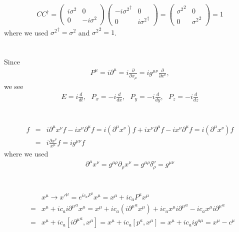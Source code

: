 \documentclass[11pt]{article}
\def\del{{\partial}}
\begin{document}
\section{ }
\begin{eqnarray}
  C C^\dagger = 
  \begin{pmatrix}
    i \sigma^2 & 0 \\
    0 & -i\sigma^2
  \end{pmatrix}
  \begin{pmatrix}
    -i {\sigma^2}^\dagger & 0 \\
    0 & i{\sigma^2}^\dagger
  \end{pmatrix}
  =  \begin{pmatrix}
    {\sigma^2}^2 & 0 \\
    0 & {\sigma^2}^2
  \end{pmatrix}
  =1 
\end{eqnarray}
where we used ${\sigma^2}^\dagger=\sigma^2$ and ${\sigma^2}^2=1$.

\section{ }
Since
\begin{eqnarray}
  P^\mu = i\del^\mu=i\frac{\del}{\del x_\mu}=ig^{\mu \nu} \frac{\del}{\del x^\nu},
\end{eqnarray}
we see 
\begin{eqnarray}
  E   =   i\frac{d}{dt}, ~~~
  P_x = - i \frac{d}{dx},~~~
  P_y = - i \frac{d}{dy},~~~
  P_z = - i \frac{d}{dz} 
\end{eqnarray}

\section{ }
\begin{eqnarray}
  [P^\mu, x^\nu]f&=&i\del^\mu x^\nu f-i x^\nu \del^\mu f= i(\del^\mu x^\nu) f+i x^\nu \del^\mu f-i x^\nu \del^\mu f = i(\del^\mu x^\nu) f \\ &=& i \frac{\del x^\nu}{x^\mu} f = i g^{\mu \nu} f
\end{eqnarray}
where we used
\begin{eqnarray}
  \del^\mu x^\nu = g^{\mu\rho} \del_\rho x^\nu
  = g^{\mu\rho} \delta_\rho^\nu   
  = g^{\mu\nu}
\end{eqnarray}

\section{ }
\begin{eqnarray}
  &&x^\mu \to x'^\mu = e^{i c_a P^a} x^\mu 
                    = x^\mu + i c_a  P^a  x^\mu\\ 
                    &=& x^\mu + i c_a  i{\del^\mu}^a  x^\mu
                    = x^\mu + i c_a  (i{\del^\mu}^a  x^\mu)  + i c_a x^\mu i{\del^\mu}^a   - i c_a x^\mu i{\del^\mu}^a  \\
                    &=&x^\mu + i c_a [i{\del^\mu}^a, x^\mu]= x^\mu + i c_a [p^a, x^\mu]
                    = x^\mu + i c_a i g^{a\mu}
                    = x^\mu - c^\mu 
\end{eqnarray}
\end{document}
